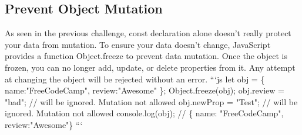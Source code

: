 \documentclass{article}%
\begin{document}
\subsection{Prevent Object Mutation}%
\label{subsec:PreventObjectMutation}%
As seen in the previous challenge, const declaration alone doesn't really protect your data from mutation. To ensure your data doesn't change, JavaScript provides a function Object.freeze to prevent data mutation.\newline%
Once the object is frozen, you can no longer add, update, or delete properties from it. Any attempt at changing the object will be rejected without an error.\newline%
```js\newline%
let obj = \{\newline%
  name:"FreeCodeCamp",\newline%
  review:"Awesome"\newline%
\};\newline%
Object.freeze(obj);\newline%
obj.review = "bad"; // will be ignored. Mutation not allowed\newline%
obj.newProp = "Test"; // will be ignored. Mutation not allowed\newline%
console.log(obj); \newline%
// \{ name: "FreeCodeCamp", review:"Awesome"\}\newline%
```\newline%

%
\end{document}
